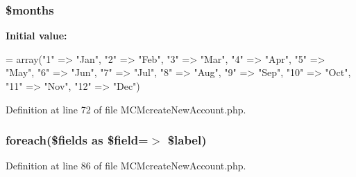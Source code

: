 \hypertarget{_m_c_mcreate_new_account_8php_a88a8980708982166840708b055e335b8}{
\subsubsection[{\$months}]{\setlength{\rightskip}{0pt plus 5cm}\$months}}\label{_m_c_mcreate_new_account_8php_a88a8980708982166840708b055e335b8}
{\bfseries Initial value\-:}
\begin{DoxyCode}
= array(\textcolor{stringliteral}{"1"} => \textcolor{stringliteral}{"Jan"},
                        \textcolor{stringliteral}{"2"} => \textcolor{stringliteral}{"Feb"},
                        \textcolor{stringliteral}{"3"} => \textcolor{stringliteral}{"Mar"},
                        \textcolor{stringliteral}{"4"} => \textcolor{stringliteral}{"Apr"},
                        \textcolor{stringliteral}{"5"} => \textcolor{stringliteral}{"May"},
                        \textcolor{stringliteral}{"6"} => \textcolor{stringliteral}{"Jun"},
                        \textcolor{stringliteral}{"7"} => \textcolor{stringliteral}{"Jul"},
                        \textcolor{stringliteral}{"8"} => \textcolor{stringliteral}{"Aug"},
                        \textcolor{stringliteral}{"9"} => \textcolor{stringliteral}{"Sep"},
                        \textcolor{stringliteral}{"10"} => \textcolor{stringliteral}{"Oct"},
                        \textcolor{stringliteral}{"11"} => \textcolor{stringliteral}{"Nov"},
                        \textcolor{stringliteral}{"12"} => \textcolor{stringliteral}{"Dec"})
\end{DoxyCode}


Definition at line 72 of file M\-C\-Mcreate\-New\-Account.\-php.

\hypertarget{_m_c_mcreate_new_account_8php_a58d12ec81e33be9b80508ee874adb2c1}{
\subsubsection[{foreach}]{\setlength{\rightskip}{0pt plus 5cm}foreach(\$fields as \$field=$>$ \$label)}}\label{_m_c_mcreate_new_account_8php_a58d12ec81e33be9b80508ee874adb2c1}


Definition at line 86 of file M\-C\-Mcreate\-New\-Account.\-php.

